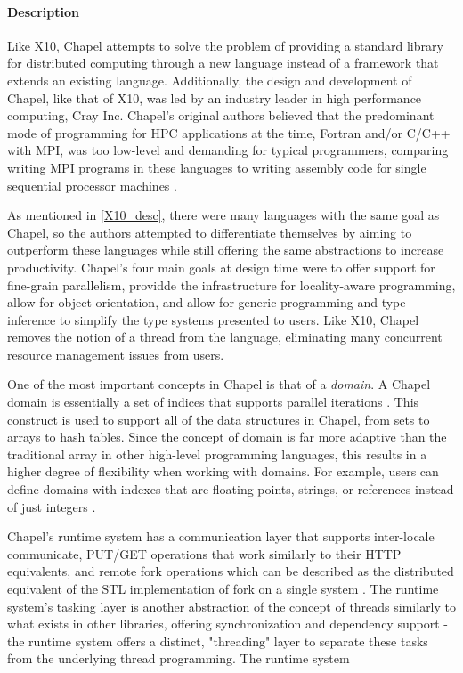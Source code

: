{	\paragraph{Description}
	Like X10, Chapel attempts to solve the problem of providing a standard library for distributed computing through a new language instead of a framework that extends an existing language. Additionally, the design and development of Chapel, like that of X10, was led by an industry leader in high performance computing, Cray Inc. Chapel's original authors believed that the predominant mode of programming for HPC applications at the time, Fortran and/or C/C++ with MPI, was too low-level and demanding for typical programmers, comparing writing MPI programs in these languages to writing assembly code for single sequential processor machines \cite{chapel}.
	
	As mentioned in \ref{X10_desc}, there were many languages with the same goal as Chapel, so the authors attempted to differentiate themselves by aiming to outperform these languages while still offering the same abstractions to increase productivity. Chapel's four main goals at design time were to offer support for fine-grain parallelism, providde the infrastructure for locality-aware programming, allow for object-orientation, and allow for generic programming and type inference to simplify the type systems presented to users. Like X10, Chapel removes the notion of a thread from the language, eliminating many concurrent resource management issues from users. 

	One of the most important concepts in Chapel is that of a \textit{domain}. A Chapel domain is essentially a set of indices that supports parallel iterations \cite{chapel_2007}. This construct is used to support all of the data structures in Chapel, from sets to arrays to hash tables. Since the concept of domain is far more adaptive than the traditional array in other high-level programming languages, this results in a higher degree of flexibility when working with domains. For example, users can define domains with indexes that are floating points, strings, or references instead of just integers \cite{chapel_2007}. 

	Chapel's runtime system has a communication layer that supports inter-locale communicate, PUT/GET operations that work similarly to their HTTP equivalents, and remote fork operations which can be described as the distributed equivalent of the STL implementation of fork on a single system \cite{chapel_rts_ppt}. The runtime system's tasking layer is another abstraction of the concept of threads similarly to what exists in other libraries, offering synchronization and dependency support - the runtime system offers a distinct, "threading" layer to separate these tasks from the underlying thread programming.  The runtime system 
}
